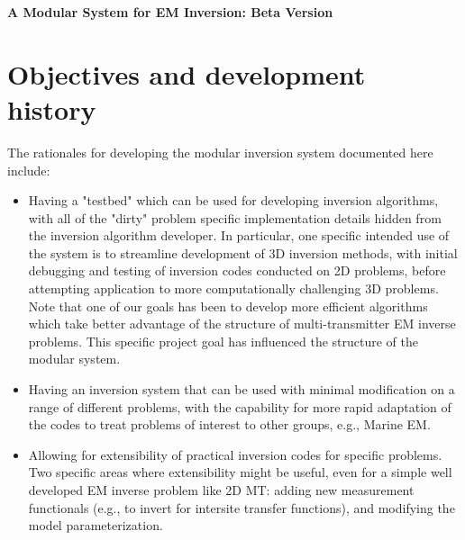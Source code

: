 \documentclass[12pt]{article}
\begin{document}

\begin{center}
{\bf \Large A Modular System for EM Inversion: Beta Version}
\end{center}

\section{Objectives and development history}

The rationales for developing the modular inversion system
documented here include:

\begin{itemize}
\item
Having a "testbed"  which can be used
for developing inversion algorithms,
with all of the "dirty" problem specific implementation
details hidden from the inversion algorithm developer.
In particular, one specific intended use of the system
is to streamline development of 3D inversion methods,
with initial debugging and testing of inversion codes conducted 
on 2D problems, before attempting application
to more computationally challenging 3D problems.
Note that one of our goals has been to develop more efficient algorithms
which take better advantage of the structure of multi-transmitter
EM inverse problems.  This specific project goal has influenced
the structure of the modular system.

\item
Having an inversion system that can be used with minimal
modification on a range of different problems, with the capability
for more rapid adaptation of the codes to treat
problems of interest to other groups, e.g., Marine EM.

\item
Allowing for extensibility of practical inversion codes
for specific problems.  Two specific areas where extensibility
might be useful, even for a simple well developed EM inverse
problem like 2D MT: adding new
measurement functionals (e.g., to invert for intersite transfer
functions), and modifying the model parameterization.
\end{itemize}
\end{document}
